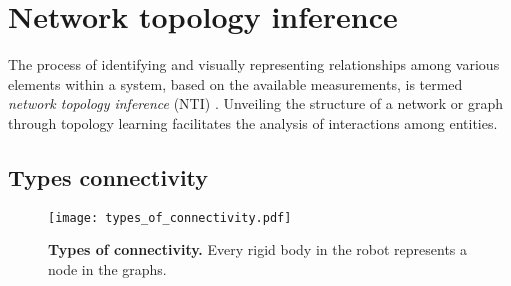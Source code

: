 \section{Network topology inference}
The process of identifying and visually representing relationships among various elements within a system, based on the available measurements, is termed \emph{network topology inference} (NTI) \cite{Dong2019Learninggraphsdata}. Unveiling the structure of a network or graph through topology learning facilitates the analysis of interactions among entities. 

\subsection{Types connectivity}

\begin{figure*}[!h]
	\centering	
	\hspace*{\fill}
	\texttt{[image: types\_of\_connectivity.pdf]}
	\hspace*{\fill}	
	\caption[] {\label{fig:types_of_connectivity}\textbf{Types of connectivity.} Every rigid body in the robot represents a node in the graphs.}
\end{figure*}

